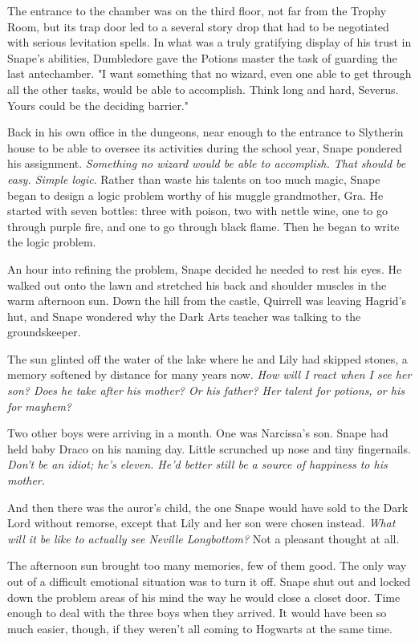 The entrance to the chamber was on the third floor, not far from the Trophy Room, but its trap door led to a several story drop that had to be negotiated with serious levitation spells. In what was a truly gratifying display of his trust in Snape's abilities, Dumbledore gave the Potions master the task of guarding the last antechamber. "I want something that no wizard, even one able to get through all the other tasks, would be able to accomplish. Think long and hard, Severus. Yours could be the deciding barrier."

Back in his own office in the dungeons, near enough to the entrance to Slytherin house to be able to oversee its activities during the school year, Snape pondered his assignment. \emph{Something no wizard would be able to accomplish. That should be easy. Simple logic}. Rather than waste his talents on too much magic, Snape began to design a logic problem worthy of his muggle grandmother, Gra. He started with seven bottles: three with poison, two with nettle wine, one to go through purple fire, and one to go through black flame. Then he began to write the logic problem.

An hour into refining the problem, Snape decided he needed to rest his eyes. He walked out onto the lawn and stretched his back and shoulder muscles in the warm afternoon sun. Down the hill from the castle, Quirrell was leaving Hagrid's hut, and Snape wondered why the Dark Arts teacher was talking to the groundskeeper.

The sun glinted off the water of the lake where he and Lily had skipped stones, a memory softened by distance for many years now. \emph{How will I react when I see her son? Does he take after his mother? Or his father? Her talent for potions, or his for mayhem?}

Two other boys were arriving in a month. One was Narcissa's son. Snape had held baby Draco on his naming day. Little scrunched up nose and tiny fingernails. \emph{Don't be an idiot; he's eleven. He'd better still be a source of happiness to his mother.}

And then there was the auror's child, the one Snape would have sold to the Dark Lord without remorse, except that Lily and her son were chosen instead. \emph{What will it be like to actually see Neville Longbottom?} Not a pleasant thought at all.

The afternoon sun brought too many memories, few of them good. The only way out of a difficult emotional situation was to turn it off. Snape shut out and locked down the problem areas of his mind the way he would close a closet door. Time enough to deal with the three boys when they arrived. It would have been so much easier, though, if they weren't all coming to Hogwarts at the same time.

